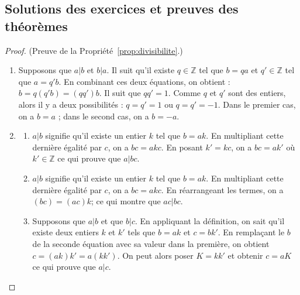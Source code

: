 \begin{corrige}
\section{Solutions des exercices et preuves des th\'eor\`emes}
\begin{proof}
(Preuve de la Propri\'et\'e~\ref{prop:divisibilite}.)
\begin{enumerate}
\item Supposons que $a|b$ et $b|a$.
      Il suit qu'il existe $q \in \mathbb{Z}$ tel que $b = q a $ et 
      $q' \in \mathbb{Z}$ tel que $a = q' b$.
      En combinant ces deux \'equations, on obtient : $b  = q ( q' b) = (q q') b$.
      Il suit que $qq' = 1$.
      Comme $q$ et $q'$ sont des entiers, alors il y a deux possibilit\'es :
            $q = q' = 1$ ou $q = q' = -1$.
      Dans le premier cas, on a $b = a$ ; dans le second cas, on a $b = - a$.
\item \begin{enumerate}
      \item $a | b$ signifie qu'il existe un entier $k$ tel que $b = ak$.
            En multipliant cette derni\`ere \'egalit\'e par $c$, on a $b c = a k c$.
            En posant $k' = kc$, on a $bc = a k'$ o\`u $k' \in \mathbb{Z}$
            ce qui prouve que $a | bc$.
      \item $a | b$ signifie qu'il existe un entier $k$ tel que $b = ak$.
            En multipliant cette derni\`ere \'egalit\'e par $c$, on a $b c = a k c$.
            En r\'earrangeant les termes, on a $(bc) = (ac) k$; ce qui montre que $ac | bc$.
      \item Supposons que $a | b $ et que $b | c$.
            En appliquant la d\'efinition, on sait qu'il existe deux entiers $k$ et $k'$ tels que 
            $b = ak$ et $c = bk'$.
            En rempla\c{c}ant le $b$ de la seconde \'equation avec sa valeur dans la premi\`ere, on obtient
            $c = (ak)k' = a(kk')$.
            On peut alors poser $K = kk'$ et obtenir $c = aK$ ce qui prouve que $a | c$.
      \end{enumerate}
\end{enumerate}
\end{proof}
\end{corrige}

